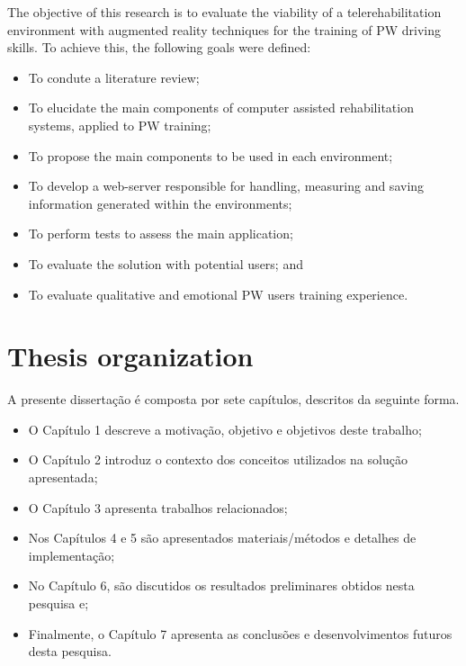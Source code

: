The objective of this research is to evaluate the viability of a telerehabilitation environment with augmented reality techniques for the training of PW driving skills. To achieve this, the following goals were defined:
\begin{itemize}
\item To condute a literature review;
\item To elucidate the main components of computer assisted rehabilitation systems, applied to PW training;
\item To propose the main components to be used in each environment;
\item To develop a web-server responsible for handling, measuring and saving information generated within the environments;
\item To perform tests to assess the main application;
\item To evaluate the solution with potential users; and
\item To evaluate qualitative and emotional PW users training experience.
\end{itemize}

\section{Thesis organization}

A presente dissertação é composta por sete capítulos, descritos da seguinte forma.
\begin{itemize}
\item O Capítulo 1 descreve a motivação, objetivo e objetivos deste trabalho;
\item O Capítulo 2 introduz o contexto dos conceitos utilizados na solução apresentada;
\item O Capítulo 3 apresenta trabalhos relacionados;
\item Nos Capítulos 4 e 5 são apresentados materiais/métodos e detalhes de implementação;
\item No Capítulo 6, são discutidos os resultados preliminares obtidos nesta pesquisa e;
\item Finalmente, o Capítulo 7 apresenta as conclusões e desenvolvimentos futuros desta pesquisa.
\end{itemize}